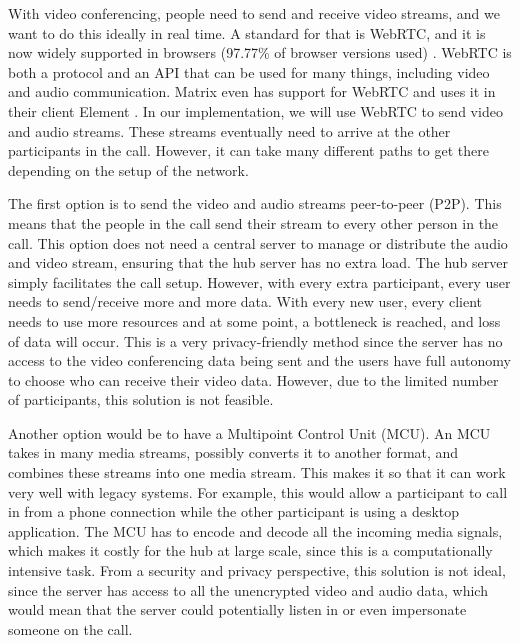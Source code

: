 \documentclass{report}
\begin{document}
With video conferencing, people need to send and receive video streams, and we want to do this ideally in real time.
A standard for that is WebRTC, and it is now widely supported in browsers (97.77\% of browser versions used) \cite{
noauthor_webrtc_nodate}. WebRTC is both a protocol and an API that can be used for many things, including video and audio communication.
Matrix even has support for WebRTC and uses it in their client Element \cite{noauthor_element_nodate}. In our
implementation, we will use WebRTC to send video and audio streams. These streams eventually need to arrive at
the other participants in the call. However, it can take many different paths to get there depending on the setup of
the network.

The first option is to send the video and audio streams peer-to-peer (P2P). This means that the people in
the call send their stream to every other person in the call. This option does not need a central server to manage or
distribute the audio and video stream, ensuring that the hub server has no extra load. The hub server simply
facilitates the call setup. However, with every extra participant, every user needs to send/receive more and more
data. With every new user, every client needs to use more resources and at some point, a bottleneck is
reached, and loss of data will occur. This is a very privacy-friendly method since the server has no access to the
video conferencing data being sent and the users have full autonomy to choose who can receive their video data.
However, due to the limited number of participants, this solution is not feasible.

Another option would be to have a Multipoint Control Unit (MCU). An MCU takes in many media streams, possibly
converts it to another format, and combines these streams into one media stream. This makes it so that it can work
very well with legacy systems. For example, this would allow a participant to call in from a phone
connection while the other participant is using a desktop application. The MCU has to encode and decode all the
incoming media signals, which makes it costly for the hub at large scale, since this is a computationally intensive
task. From a security and privacy perspective, this solution is not ideal, since the server has access to all the
unencrypted video and audio data, which would mean that the server could potentially listen in or even impersonate
someone on the call.
\end{document}
